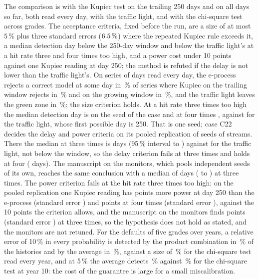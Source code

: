 The comparison is with the Kupiec test on the trailing 250 days and on all days so far, both read every day, with the traffic light, and with the chi-square test across grades. The acceptance criteria, fixed before the run, are a size of at most $5\,\%$ plus three standard errors ($6.5\,\%$) where the repeated Kupiec rule exceeds it, a median detection day below the 250-day window and below the traffic light's at a hit rate three and four times too high, and a power cost under 10 points against one Kupiec reading at day 250; the method is refuted if the delay is not lower than the traffic light's. On series of \pxFifteenHorizon{} days read every day, the e-process rejects a correct model at some day in \pxFifteenENull{}\,\% of \pxFifteenReps{} series where Kupiec on the trailing window rejects in \pxFifteenKupTrail{}\,\% and on the growing window in \pxFifteenKupCum{}\,\%, and the traffic light leaves the green zone in \pxFifteenLightNull{}\,\%; the size criterion holds. At a hit rate three times too high the median detection day is \pxFifteenXThreeDay{} on the seed of the case and at four times \pxFifteenXFourDay{}, against \pxFifteenLightDay{} for the traffic light, whose first possible day is 250. That is one seed; case C22 decides the delay and power criteria on its pooled replication of \pxFifteenPoolSeeds{} seeds of \pxFifteenPoolReps{} streams. There the median at three times is \pxFifteenPoolThreeMed{} days (95\,\% interval \pxFifteenPoolThreeLo{} to \pxFifteenPoolThreeHi{}) against \pxFifteenPoolLight{} for the traffic light, not below the window, so the delay criterion fails at three times and holds at four (\pxFifteenPoolFourMed{} days). The manuscript on the monitors, which pools independent seeds of its own, reaches the same conclusion with a median of \pxPpFifteenThreeMed{} days (\pxPpFifteenThreeMedLo{} to \pxPpFifteenThreeMedHi{}) at three times. The power criterion fails at the hit rate three times too high: on the pooled replication one Kupiec reading has \pxFifteenPoolCostThree{} points more power at day 250 than the e-process (standard error \pxFifteenPoolCostThreeSe{}) and \pxFifteenPoolCostFour{} points at four times (standard error \pxFifteenPoolCostFourSe{}), against the 10 points the criterion allows, and the manuscript on the monitors finds \pxPpFifteenThreeCost{} points (standard error \pxPpFifteenThreeCostSe{}) at three times, so the hypothesis does not hold as stated, and the monitors are not retuned. For the defaults of five grades over \pxFifteenPdYears{} years, a relative error of 10\,\% in every probability is detected by the product combination in \pxFifteenPdTenProduct{}\,\% of the histories and by the average in \pxFifteenPdTenAverage{}\,\%, against a size of \pxFifteenPdNullChi{}\,\% for the chi-square test read every year, and at 5\,\% the average detects \pxFifteenPdFiveAverage{}\,\% against \pxFifteenPdFiveChi{}\,\% for the chi-square test at year 10: the cost of the guarantee is large for a small miscalibration.
